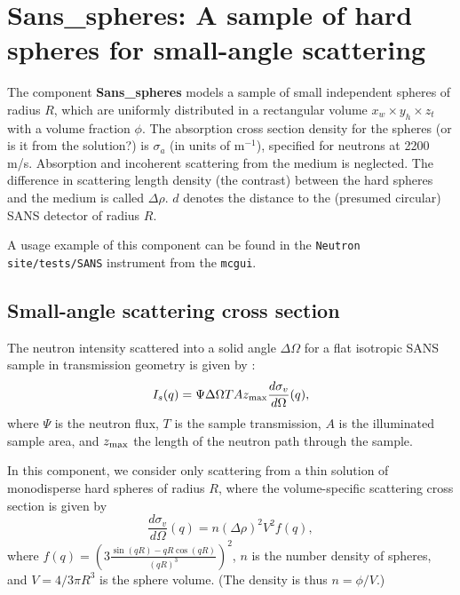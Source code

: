 \section{Sans\_spheres: A sample of hard spheres for small-angle scattering}
\label{sans}


The component {\bf Sans\_spheres} models a sample of small independent
spheres of radius $R$, which are uniformly distributed
in a rectangular volume $x_w \times y_h \times z_t$ with a volume
fraction $\phi$. The absorption cross section density for the spheres
(or is it from the solution?)
is $\sigma_a$ (in units of m$^{-1}$), specified
for neutrons at 2200 m/s. Absorption and incoherent scattering
from the medium is neglected.
The difference in scattering length density
(the contrast) between the hard spheres and the medium is called $\Delta \rho$.
$d$ denotes the distance to the (presumed circular) SANS detector of radius $R$.

A usage example of this component can be found in the \verb+Neutron site/tests/SANS+ instrument from the \verb+mcgui+.

\subsection{Small-angle scattering cross section}
The neutron intensity scattered into a solid angle $\Delta \Omega$
for a flat isotropic SANS sample in transmission geometry
is given by \cite{ILLblue}:
\begin{equation}
I_s(q) = \Psi \Delta\Omega T A z_{\rm max} \frac{d\sigma_v}{d\Omega}(q) ,
\end{equation}
where $\Psi$ is the neutron flux, $T$ is the sample transmission,
$A$ is the illuminated sample area, and $z_{\rm max}$ the length of
the neutron path through the sample.

In this component, we consider only scattering from a thin solution
of monodisperse hard spheres of radius $R$, where the volume-specific
scattering cross section is given by \cite{ILLblue}
\begin{equation}
\frac{d\sigma_v}{d\Omega}(q) =
  n (\Delta\rho)^2 V^2 f(q)  ,
\end{equation}
where $f(q) = \left( 3\frac{\sin(qR)-qR\cos(qR)}{(qR)^3} \right)^2$,
$n$ is the number density of spheres, and $V = 4 / 3 \pi R^3$ is the
sphere volume. (The density is thus $n = \phi/V$.)

